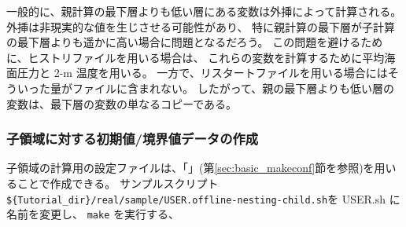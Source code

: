 一般的に、親計算の最下層よりも低い層にある変数は外挿によって計算される。
外挿は非現実的な値を生じさせる可能性があり、
特に親計算の最下層が子計算の最下層よりも遥かに高い場合に問題となるだろう。
この問題を避けるために、ヒストリファイルを用いる場合は、
これらの変数を計算するために平均海面圧力と 2-m 温度を用いる。
一方で、リスタートファイルを用いる場合にはそういった量がファイルに含まれない。
したがって、親の最下層よりも低い層の変数は、最下層の変数の単なるコピーである。

\subsubsection{子領域に対する初期値/境界値データの作成}

子領域の計算用の設定ファイルは、「\makeconftool」(第\ref{sec:basic_makeconf}節を参照)を用いることで作成できる。
サンプルスクリプト\verb|${Tutorial_dir}/real/sample/USER.offline-nesting-child.sh|を USER.sh に名前を変更し、 \verb|make| を実行する、

